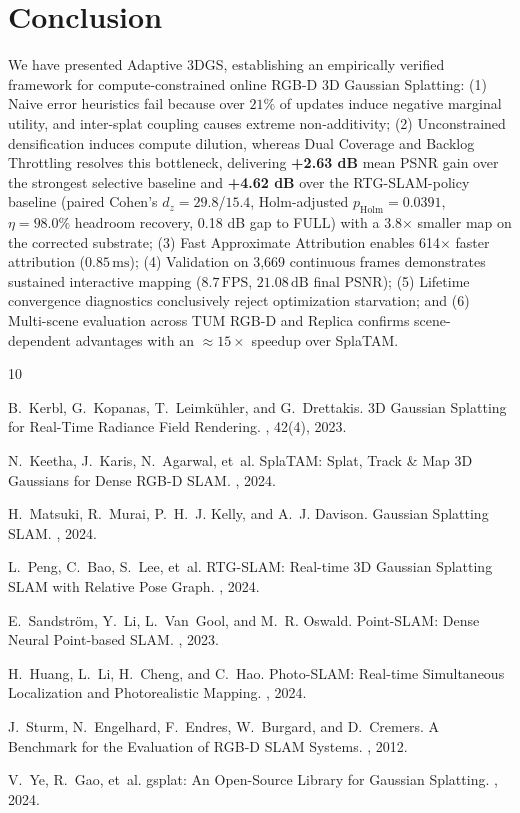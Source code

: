 \documentclass[10pt,twocolumn,letterpaper]{article}
\begin{document}
\section{Conclusion}
We have presented Adaptive 3DGS, establishing an empirically verified framework for compute-constrained online RGB-D 3D Gaussian Splatting:
(1) Naive error heuristics fail because over $21\%$ of updates induce negative marginal utility, and inter-splat coupling causes extreme non-additivity;
(2) Unconstrained densification induces compute dilution, whereas Dual Coverage and Backlog Throttling resolves this bottleneck, delivering \textbf{+2.63 dB} mean PSNR gain over the strongest selective baseline and \textbf{+4.62 dB} over the RTG-SLAM-policy baseline (paired Cohen's $d_z = 29.8$/$15.4$, Holm-adjusted $p_{\mathrm{Holm}} = 0.0391$, $\eta = 98.0\%$ headroom recovery, 0.18 dB gap to FULL) with a 3.8$\times$ smaller map on the corrected substrate;
(3) Fast Approximate Attribution enables 614$\times$ faster attribution ($0.85\,\mathrm{ms}$);
(4) Validation on 3,669 continuous frames demonstrates sustained interactive mapping ($8.7\,\mathrm{FPS}$, $21.08\,\mathrm{dB}$ final PSNR);
(5) Lifetime convergence diagnostics conclusively reject optimization starvation; and
(6) Multi-scene evaluation across TUM RGB-D and Replica confirms scene-dependent advantages with an $\approx 15\times$ speedup over SplaTAM.

{\footnotesize

\begin{thebibliography}{10}\itemsep=-4pt

B.~Kerbl, G.~Kopanas, T.~Leimk{\"u}hler, and G.~Drettakis.
\newblock 3D Gaussian Splatting for Real-Time Radiance Field Rendering.
, 42(4), 2023.

N.~Keetha, J.~Karis, N.~Agarwal, et~al.
\newblock SplaTAM: Splat, Track \& Map 3D Gaussians for Dense RGB-D SLAM.
, 2024.

H.~Matsuki, R.~Murai, P.~H.~J. Kelly, and A.~J. Davison.
\newblock Gaussian Splatting SLAM.
, 2024.

L.~Peng, C.~Bao, S.~Lee, et~al.
\newblock RTG-SLAM: Real-time 3D Gaussian Splatting SLAM with Relative Pose Graph.
, 2024.

E.~Sandstr{\"o}m, Y.~Li, L.~Van~Gool, and M.~R. Oswald.
\newblock Point-SLAM: Dense Neural Point-based SLAM.
, 2023.

H.~Huang, L.~Li, H.~Cheng, and C.~Hao.
\newblock Photo-SLAM: Real-time Simultaneous Localization and Photorealistic Mapping.
, 2024.

J.~Sturm, N.~Engelhard, F.~Endres, W.~Burgard, and D.~Cremers.
\newblock A Benchmark for the Evaluation of RGB-D SLAM Systems.
, 2012.

V.~Ye, R.~Gao, et~al.
\newblock gsplat: An Open-Source Library for Gaussian Splatting.
, 2024.

\end{thebibliography}
}
\end{document}
